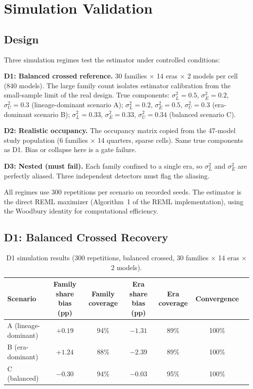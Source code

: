 \documentclass[journal]{IEEEtran}
\begin{document}
\section{Simulation Validation}
\label{sec:simulation}

\subsection{Design}

Three simulation regimes test the estimator under controlled conditions:

\textbf{D1: Balanced crossed reference.} 30 families $\times$ 14 eras $\times$ 2 models per cell (840 models). The large family count isolates estimator calibration from the small-sample limit of the real design. True components: $\sigma^2_L = 0.5$, $\sigma^2_E = 0.2$, $\sigma^2_U = 0.3$ (lineage-dominant scenario A); $\sigma^2_L = 0.2$, $\sigma^2_E = 0.5$, $\sigma^2_U = 0.3$ (era-dominant scenario B); $\sigma^2_L = 0.33$, $\sigma^2_E = 0.33$, $\sigma^2_U = 0.34$ (balanced scenario C).

\textbf{D2: Realistic occupancy.} The occupancy matrix copied from the 47-model study population (6 families $\times$ 14 quarters, sparse cells). Same true components as D1. Bias or collapse here is a gate failure.

\textbf{D3: Nested (must fail).} Each family confined to a single era, so $\sigma^2_L$ and $\sigma^2_E$ are perfectly aliased. Three independent detectors must flag the aliasing.

All regimes use 300 repetitions per scenario on recorded seeds. The estimator is the direct REML maximizer (Algorithm~1 of the REML implementation), using the Woodbury identity for computational efficiency.

\subsection{D1: Balanced Crossed Recovery}

\begin{table}[!t]
\centering
\caption{D1 simulation results (300 repetitions, balanced crossed, 30 families $\times$ 14 eras $\times$ 2 models).}
\label{tab:d1}
\begin{tabular}{lcccccc}
\toprule
Scenario & Family share bias (pp) & Family coverage & Era share bias (pp) & Era coverage & Convergence \\
\midrule
A (lineage-dominant) & $+0.19$ & 94\% & $-1.31$ & 89\% & 100\% \\
B (era-dominant) & $+1.24$ & 88\% & $-2.39$ & 89\% & 100\% \\
C (balanced) & $-0.30$ & 94\% & $-0.03$ & 95\% & 100\% \\
\bottomrule
\end{tabular}
\end{table}
\end{document}

